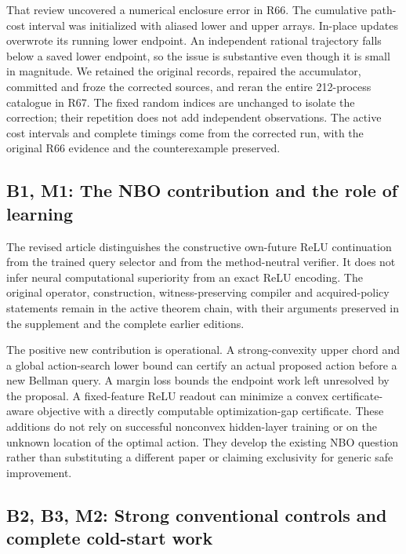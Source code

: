 \documentclass[ecta,nameyear,draft]{econsocart}
\begin{document}
That review uncovered a numerical enclosure error in R66. The cumulative
path-cost interval was initialized with aliased lower and upper arrays.
In-place updates overwrote its running lower endpoint. An independent
rational trajectory falls below a saved lower endpoint, so the issue is
substantive even though it is small in magnitude. We retained the
original records, repaired the accumulator, committed and froze the
corrected sources, and reran the entire 212-process catalogue in R67.
The fixed random indices are unchanged to isolate the correction; their
repetition does not add independent observations. The active cost
intervals and complete timings come from the corrected run, with the
original R66 evidence and the counterexample preserved.

\hypertarget{b1-m1-the-nbo-contribution-and-the-role-of-learning}{%
\subsection{B1, M1: The NBO contribution and the role of
learning}\label{b1-m1-the-nbo-contribution-and-the-role-of-learning}}

The revised article distinguishes the constructive own-future ReLU
continuation from the trained query selector and from the method-neutral
verifier. It does not infer neural computational superiority from an
exact ReLU encoding. The original operator, construction,
witness-preserving compiler and acquired-policy statements remain in the
active theorem chain, with their arguments preserved in the supplement
and the complete earlier editions.

The positive new contribution is operational. A strong-convexity upper
chord and a global action-search lower bound can certify an actual
proposed action before a new Bellman query. A margin loss bounds the
endpoint work left unresolved by the proposal. A fixed-feature ReLU
readout can minimize a convex certificate-aware objective with a
directly computable optimization-gap certificate. These additions do not
rely on successful nonconvex hidden-layer training or on the unknown
location of the optimal action. They develop the existing NBO question
rather than substituting a different paper or claiming exclusivity for
generic safe improvement.

\hypertarget{b2-b3-m2-strong-conventional-controls-and-complete-cold-start-work}{%
\subsection{B2, B3, M2: Strong conventional controls and complete
cold-start
work}\label{b2-b3-m2-strong-conventional-controls-and-complete-cold-start-work}}
\end{document}
